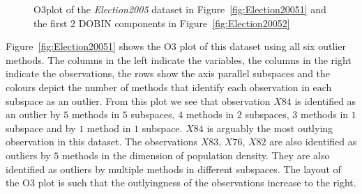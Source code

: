 \documentclass[11pt]{article}
\begin{document}
\begin{figure}[!ht]
	\centering
	\caption{O3plot of the \textit{Election2005} dataset in Figure~\ref{fig:Election20051} and the first 2 DOBIN components in Figure~\ref{fig:Election20052} }
	\label{fig:Election2005}
\end{figure}

Figure~\ref{fig:Election20051} shows the O3 plot of this dataset using all six outlier methods. The columns in the left indicate the variables, the columns in the right indicate the observations, the rows show the axis parallel subspaces and the colours depict the number of methods that identify each observation in each subspace as an outlier. From this plot we see that observation $X84$ is identified as an outlier by $5$ methods in $5$ subspaces, $4$ methods in $2$ subspaces, $3$ methods in $1$ subspace and by $1$ method in $1$ subspace. $X84$ is arguably the most outlying observation in this dataset. The observations $X83$, $X76$, $X82$ are also identified as outliers by $5$ methods in the dimension of population density. They are also identified as outliers by multiple methods in different subspaces. The layout of the O3 plot is such that the outlyingness of the observations increase to the right. \\
\end{document}
